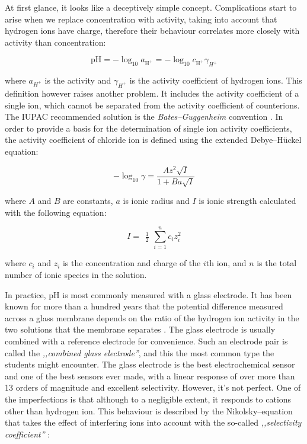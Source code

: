 \documentclass[manuscript=article, journal=jceda8]{achemso}
\begin{document}
At first glance, it looks like a deceptively simple concept. Complications start to arise when we replace concentration with activity, taking into account that hydrogen ions have charge, therefore their behaviour correlates more closely with activity than concentration:

\begin{equation}
\textrm{pH} = -\log_{10} a_{\textrm{H}^+} = -\log_{10} c_{\textrm{H}^+} \gamma_{H^+}
\end{equation}

where $a_{H^+}$ is the activity and $\gamma_{H^+}$ is the activity coefficient of hydrogen ions. This definition however raises another problem. It includes the activity coefficient of a single ion, which cannot be separated from the activity coefficient of counterions. The IUPAC recommended solution \cite{buck2002measurement} is the \emph{Bates--Guggenheim} convention  \cite{bates1960report}. In order to provide a basis for the determination of single ion activity coefficients, the activity coefficient of chloride ion is defined using the extended Debye--Hückel equation:

\begin{equation}
-\log_{10} \gamma = \frac{A z^2 \sqrt{I}} {1 + Ba\sqrt{I} }
\label{EDH}
\end{equation}

where $A$ and $B$ are constants, $a$ is ionic radius and $I$ is ionic strength calculated with the following equation:

\begin{equation}
I = \begin{matrix}\frac{1}{2}\end{matrix}\sum_{i=1}^{n} c_i z_i^{2}
\label{ionic_strength}
\end{equation}

where $c_i$ and $z_i$ is the concentration and charge of the $i$th ion, and $n$ is the total number of ionic species in the solution. 

In practice, pH is most commonly measured with a glass electrode.
It has been known for more than a hundred years that the potential difference measured across a glass membrane depends on the ratio of the hydrogen ion activity in the two solutions that the membrane separates \cite{haber1909elektrische, haber1909concerning}.
The glass electrode is usually combined with a reference electrode for convenience.
Such an electrode pair is called the \emph{,,combined glass electrode''}, and this the most common type the students might encounter.
The glass electrode is the best electrochemical sensor and one of the best sensors ever made, with a linear response of over more than 13 orders of magnitude and excellent selectivity.
However, it's not perfect. One of the imperfections is that although to a negligible extent, it responds to cations other than hydrogen ion.
This behaviour is described by the Nikolsky--equation that takes the effect of interfering ions into account with the so-called \emph{,,selectivity coefficient''} \cite{nicolsky1937theory}:
\end{document}
